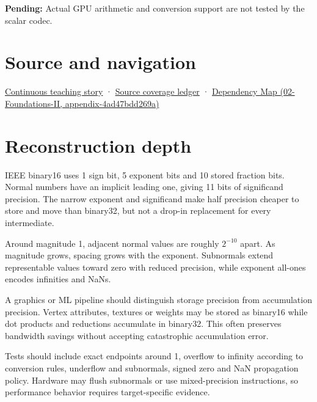 \textbf{Pending:} Actual GPU arithmetic and conversion support are not tested by the scalar codec.

\section{Source and navigation}\label{appendix-34443cec7170-source-and-navigation}

\href{Continuous\%20Notes/Computing\%20Foundations\%20-\%20From\%20Bits\%20to\%20C++\%20and\%20Systems\%20APIs\#Choosing\%20what\%20information\%20to\%20keep}{Continuous teaching story} · \hyperref[appendix-fd090d982a15]{Source coverage ledger} · \href{../02-Foundations-II/main.pdf\#nameddest=appendix-4ad47bdd269a}{Dependency Map (02-Foundations-II, appendix-4ad47bdd269a)}

\section{Reconstruction depth}\label{appendix-34443cec7170-reconstruction-depth}

IEEE binary16 uses 1 sign bit, 5 exponent bits and 10 stored fraction bits. Normal numbers have an implicit leading one, giving 11 bits of significand precision. The narrow exponent and significand make half precision cheaper to store and move than binary32, but not a drop-in replacement for every intermediate.

Around magnitude 1, adjacent normal values are roughly \(2^{-10}\) apart. As magnitude grows, spacing grows with the exponent. Subnormals extend representable values toward zero with reduced precision, while exponent all-ones encodes infinities and NaNs.

A graphics or ML pipeline should distinguish storage precision from accumulation precision. Vertex attributes, textures or weights may be stored as binary16 while dot products and reductions accumulate in binary32. This often preserves bandwidth savings without accepting catastrophic accumulation error.

Tests should include exact endpoints around 1, overflow to infinity according to conversion rules, underflow and subnormals, signed zero and NaN propagation policy. Hardware may flush subnormals or use mixed-precision instructions, so performance behavior requires target-specific evidence.
